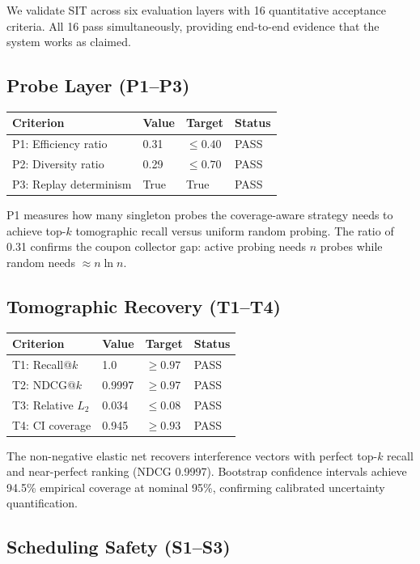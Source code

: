 \documentclass[11pt,twocolumn]{article}
\begin{document}
We validate SIT across six evaluation layers with 16 quantitative
acceptance criteria. All 16 pass simultaneously, providing end-to-end
evidence that the system works as claimed.

\subsection{Probe Layer (P1--P3)}

\begin{tabular}{llll}
\toprule
Criterion & Value & Target & Status \\
\midrule
P1: Efficiency ratio & 0.31 & $\leq 0.40$ & PASS \\
P2: Diversity ratio & 0.29 & $\leq 0.70$ & PASS \\
P3: Replay determinism & True & True & PASS \\
\bottomrule
\end{tabular}

\noindent P1 measures how many singleton probes the coverage-aware
strategy needs to achieve top-$k$ tomographic recall versus uniform
random probing. The ratio of 0.31 confirms the coupon collector gap:
active probing needs $n$ probes while random needs $\approx n \ln n$.

\subsection{Tomographic Recovery (T1--T4)}

\begin{tabular}{llll}
\toprule
Criterion & Value & Target & Status \\
\midrule
T1: Recall@$k$ & 1.0 & $\geq 0.97$ & PASS \\
T2: NDCG@$k$ & 0.9997 & $\geq 0.97$ & PASS \\
T3: Relative $L_2$ & 0.034 & $\leq 0.08$ & PASS \\
T4: CI coverage & 0.945 & $\geq 0.93$ & PASS \\
\bottomrule
\end{tabular}

\noindent The non-negative elastic net recovers interference vectors
with perfect top-$k$ recall and near-perfect ranking (NDCG 0.9997).
Bootstrap confidence intervals achieve 94.5\% empirical coverage at
nominal 95\%, confirming calibrated uncertainty quantification.

\subsection{Scheduling Safety (S1--S3)}
\end{document}
